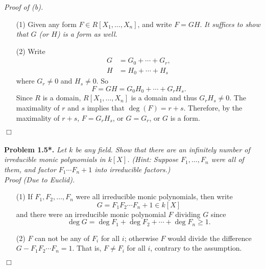 \documentclass{article}
\begin{document}
\emph{Proof of (b).}
\begin{enumerate}
\item[(1)]
  Given any form $F \in R[X_1,\ldots,X_n]$, and write $F = GH$.
  \emph{It suffices to show that $G$ (or $H$) is a form as well.}

\item[(2)]
  Write
  \begin{align*}
    G &= G_0+\cdots+G_r, \\
    H &= H_0+\cdots+H_s
  \end{align*}
  where $G_r \neq 0$ and $H_s \neq 0$.
  So
  \[
    F = GH = G_0H_0 + \cdots + G_r H_s.
  \]
  Since $R$ is a domain, $R[X_1,\ldots,X_n]$ is a domain and thus $G_r H_s \neq 0$.
  The maximality of $r$ and $s$ implies that $\deg(F) = r+s$.
  Therefore, by the maximality of $r+s$,
  $F = G_r H_s$, or $G = G_r$, or $G$ is a form.
\end{enumerate}
$\Box$\\\\






\textbf{Problem 1.5*.}
\emph{Let $k$ be any field.
Show that there are an infinitely number of irreducible monic polynomials in $k[X]$.
(Hint: Suppose $F_1,\ldots,F_n$ were all of them, and factor $F_1\cdots F_n+1$ into irreducible factors.)} \\

\emph{Proof (Due to Euclid).}
\begin{enumerate}
\item[(1)]
  If
  $F_1, F_2, \ldots, F_n$ were all irreducible monic polynomials, then
  write
  \[
    G = F_1 F_2 \cdots F_n + 1 \in k[X]
  \]
  and there were an irreducible monic polynomial $F$ dividing $G$
  since
  \[
    \deg G = \deg F_1 + \deg F_2 + \cdots + \deg F_n \geq 1.
  \]

\item[(2)]
  $F$ can not be any of $F_i$ for all $i$;
  otherwise $F$ would divide the difference $G - F_1 F_2 \cdots F_n = 1$.
  That is, $F \neq F_i$ for all $i$, contrary to the assumption.
\end{enumerate}
$\Box$\\\\



\end{document}
